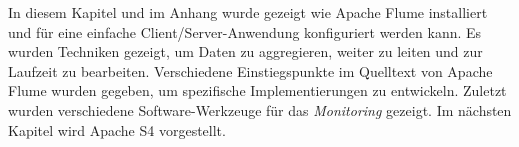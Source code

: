 In diesem Kapitel und im Anhang wurde gezeigt wie Apache Flume installiert und für eine einfache Client/Server-Anwendung konfiguriert werden kann. Es wurden Techniken gezeigt, um Daten zu aggregieren, weiter zu leiten und zur Laufzeit zu bearbeiten. Verschiedene Einstiegspunkte im Quelltext von Apache Flume wurden gegeben, um spezifische Implementierungen zu entwickeln. Zuletzt wurden verschiedene Software-Werkzeuge für das \textit{Monitoring} gezeigt. Im nächsten Kapitel wird Apache S4 vorgestellt.

